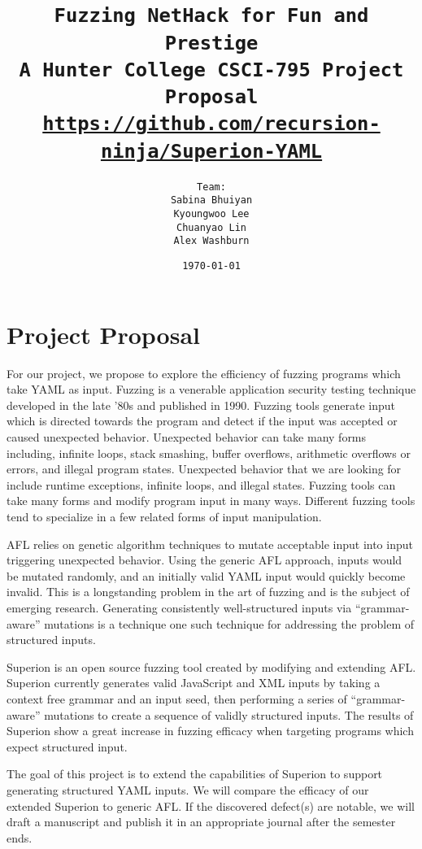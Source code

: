 \documentclass[12pt]{diazessay}
\title{\texttt{\huge{Fuzzing NetHack for Fun and Prestige} \\\vspace{-0.65cm} {\large A Hunter College CSCI-795 Project Proposal}\\\normalsize\url{https://github.com/recursion-ninja/Superion-YAML}}} %
\author{\texttt{{\Huge Team:}\\\vspace*{-0.5em} 
		Sabina Bhuiyan \\\vspace*{-0.5em} 
		Kyoungwoo Lee \\\vspace*{-0.5em}
		Chuanyao Lin \\\vspace*{-0.25em}
		Alex Washburn}} %
\date{\texttt{\today}} %
\begin{document}
\maketitle %

\vspace{-1cm}
\section*{Project Proposal}

For our project, we propose to explore the efficiency of fuzzing programs which take YAML\cite{YAMLdraft} as input.
Fuzzing is a venerable application security testing technique developed in the late '80s\cite{Barton1988} and published in 1990\cite{Miller1990}.
Fuzzing tools generate input which is directed towards the program and detect if the input was accepted or caused unexpected behavior.
Unexpected behavior can take many forms including, infinite loops, stack smashing, buffer overflows, arithmetic overflows or errors, and illegal program states.
Unexpected behavior that we are looking for include runtime exceptions, infinite loops, and illegal states.
Fuzzing tools can take many forms\cite{ModelBasedFuzzing}\cite{GrammarBasedFuzzing}\cite{ProtocolBasedFuzzing} and modify program input in many ways.
Different fuzzing tools tend to specialize in a few related forms of input\cite{InputDiversity} manipulation.

AFL relies on genetic algorithm techniques\cite{InputMutationAlgorithm} to mutate acceptable input into input triggering unexpected behavior. Using the generic AFL approach, inputs would be mutated randomly, and an initially valid YAML input would quickly become invalid.
This is a longstanding problem in the art of fuzzing and is the subject of emerging research.
Generating consistently well-structured inputs\cite{structuredInput} via ``grammar-aware'' mutations is a technique one such technique for addressing the problem of structured inputs.

Superion\cite{superion} is an open source fuzzing tool created by modifying and extending AFL.
Superion currently generates valid JavaScript and XML inputs by taking a context free grammar and an input seed, then performing a series of ``grammar-aware'' mutations to create a sequence of validly structured inputs.
The results of Superion show a great increase in fuzzing efficacy when targeting programs which expect structured input. 

The goal of this project is to extend the capabilities of Superion to support generating structured YAML inputs.
We will compare the efficacy of our extended Superion to generic AFL.
If the discovered defect(s) are notable, we will draft a manuscript and publish it in an appropriate journal after the semester ends.
\end{document}
